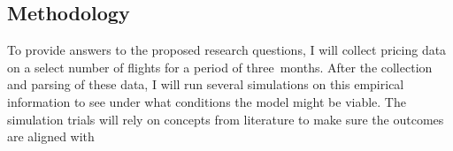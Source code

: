 \subsection{Methodology}
To provide answers to the proposed research questions, I will collect pricing data on a select number of flights for a period of three~months. After the collection and parsing of these data, I will run several simulations on this empirical information to see under what conditions the model might be viable. The simulation trials will rely on concepts from literature to make sure the outcomes are aligned with

